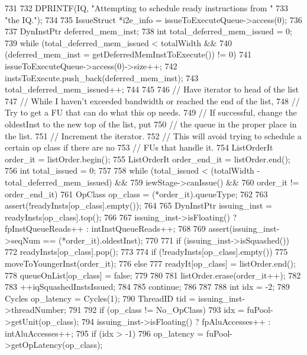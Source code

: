\begin{DoxyCode}
731 {
732     DPRINTF(IQ, "Attempting to schedule ready instructions from "
733             "the IQ.\n");
734 
735     IssueStruct *i2e_info = issueToExecuteQueue->access(0);
736 
737     DynInstPtr deferred_mem_inst;
738     int total_deferred_mem_issued = 0;
739     while (total_deferred_mem_issued < totalWidth &&
740            (deferred_mem_inst = getDeferredMemInstToExecute()) != 0) {
741         issueToExecuteQueue->access(0)->size++;
742         instsToExecute.push_back(deferred_mem_inst);
743         total_deferred_mem_issued++;
744     }
745 
746     // Have iterator to head of the list
747     // While I haven't exceeded bandwidth or reached the end of the list,
748     // Try to get a FU that can do what this op needs.
749     // If successful, change the oldestInst to the new top of the list, put
750     // the queue in the proper place in the list.
751     // Increment the iterator.
752     // This will avoid trying to schedule a certain op class if there are no
753     // FUs that handle it.
754     ListOrderIt order_it = listOrder.begin();
755     ListOrderIt order_end_it = listOrder.end();
756     int total_issued = 0;
757 
758     while (total_issued < (totalWidth - total_deferred_mem_issued) &&
759            iewStage->canIssue() &&
760            order_it != order_end_it) {
761         OpClass op_class = (*order_it).queueType;
762 
763         assert(!readyInsts[op_class].empty());
764 
765         DynInstPtr issuing_inst = readyInsts[op_class].top();
766 
767         issuing_inst->isFloating() ? fpInstQueueReads++ : intInstQueueReads++;
768 
769         assert(issuing_inst->seqNum == (*order_it).oldestInst);
770 
771         if (issuing_inst->isSquashed()) {
772             readyInsts[op_class].pop();
773 
774             if (!readyInsts[op_class].empty()) {
775                 moveToYoungerInst(order_it);
776             } else {
777                 readyIt[op_class] = listOrder.end();
778                 queueOnList[op_class] = false;
779             }
780 
781             listOrder.erase(order_it++);
782 
783             ++iqSquashedInstsIssued;
784 
785             continue;
786         }
787 
788         int idx = -2;
789         Cycles op_latency = Cycles(1);
790         ThreadID tid = issuing_inst->threadNumber;
791 
792         if (op_class != No_OpClass) {
793             idx = fuPool->getUnit(op_class);
794             issuing_inst->isFloating() ? fpAluAccesses++ : intAluAccesses++;
795             if (idx > -1) {
796                 op_latency = fuPool->getOpLatency(op_class);
}}}}
\end{DoxyCode}
